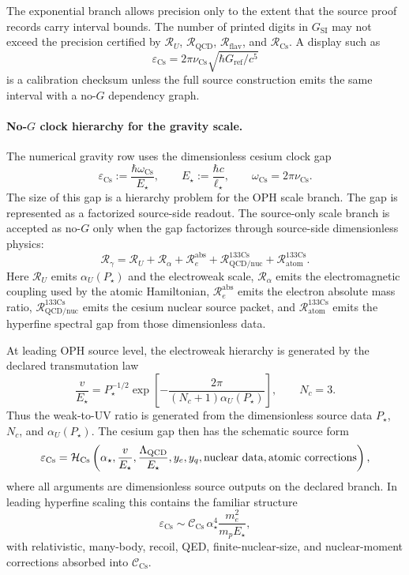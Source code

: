 \begin{remark}\label{rem:gravity-digits-policy}
The exponential branch allows precision only to the extent that the source proof records carry
interval bounds. The number of printed digits in \(G_{\mathrm{SI}}\) may not exceed the precision
certified by \(\mathcal R_U\), \(\mathcal R_{\mathrm{QCD}}\), \(\mathcal R_{\mathrm{flav}}\), and
\(\mathcal R_{\mathrm{Cs}}\). A display such as
\[
\varepsilon_{\mathrm{Cs}}
=
2\pi\nu_{\mathrm{Cs}}\sqrt{\hbar G_{\mathrm{ref}}/c^5}
\]
is a calibration checksum unless the full source construction emits the same interval with a no-\(G\)
dependency graph.
\end{remark}

\paragraph{No-\(G\) clock hierarchy for the gravity scale.}
The numerical gravity row uses the dimensionless cesium clock gap
\[
\varepsilon_{\mathrm{Cs}}
:=
\frac{\hbar\omega_{\mathrm{Cs}}}{E_\star},
\qquad
E_\star:=\frac{\hbar c}{\ell_\star},
\qquad
\omega_{\mathrm{Cs}}=2\pi\nu_{\mathrm{Cs}}.
\]
The size of this gap is a hierarchy problem for the OPH scale branch. The gap is represented as a
factorized source-side readout. The source-only scale branch is accepted as no-\(G\) only when the
gap factorizes through source-side dimensionless physics:
\[
\mathcal R_\gamma
=
\mathcal R_U
+
\mathcal R_\alpha
+
\mathcal R_{e}^{\mathrm{abs}}
+
\mathcal R_{\mathrm{QCD/nuc}}^{133\mathrm{Cs}}
+
\mathcal R_{\mathrm{atom}}^{133\mathrm{Cs}}.
\]
Here \(\mathcal R_U\) emits \(\alpha_U(P_\star)\) and the electroweak scale,
\(\mathcal R_\alpha\) emits the electromagnetic coupling used by the atomic Hamiltonian,
\(\mathcal R_e^{\mathrm{abs}}\) emits the electron absolute mass ratio,
\(\mathcal R_{\mathrm{QCD/nuc}}^{133\mathrm{Cs}}\) emits the cesium nuclear source packet, and
\(\mathcal R_{\mathrm{atom}}^{133\mathrm{Cs}}\) emits the hyperfine spectral gap from those
dimensionless data.

At leading OPH source level, the electroweak hierarchy is generated by the declared
transmutation law
\[
\frac{v}{E_\star}
=
P_\star^{-1/2}
\exp\!\left[
-\frac{2\pi}{(N_c+1)\alpha_U(P_\star)}
\right],
\qquad
N_c=3.
\]
Thus the weak-to-UV ratio is generated from the dimensionless source data
\(P_\star\), \(N_c\), and \(\alpha_U(P_\star)\). The cesium gap then has the schematic
source form
\[
\varepsilon_{\mathrm{Cs}}
=
\mathcal H_{\mathrm{Cs}}
\left(
\alpha_\star,
\frac{v}{E_\star},
\frac{\Lambda_{\mathrm{QCD}}}{E_\star},
y_e,
y_q,
\hbox{nuclear data},
\hbox{atomic corrections}
\right),
\]
where all arguments are dimensionless source outputs on the declared branch. In leading
hyperfine scaling this contains the familiar structure
\[
\varepsilon_{\mathrm{Cs}}
\sim
\mathcal C_{\mathrm{Cs}}\,
\alpha_\star^4
\frac{m_e^2}{m_pE_\star},
\]
with relativistic, many-body, recoil, QED, finite-nuclear-size, and nuclear-moment corrections
absorbed into \(\mathcal C_{\mathrm{Cs}}\).

